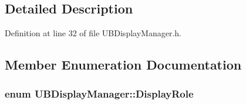 \subsection{Detailed Description}


Definition at line 32 of file U\-B\-Display\-Manager.\-h.



\subsection{Member Enumeration Documentation}
\hypertarget{class_u_b_display_manager_a8ca88c477b630972d2d9fa7810162106}{
\subsubsection[{Display\-Role}]{\setlength{\rightskip}{0pt plus 5cm}enum {\bf U\-B\-Display\-Manager\-::\-Display\-Role}}}\label{dd/d0f/class_u_b_display_manager_a8ca88c477b630972d2d9fa7810162106}
